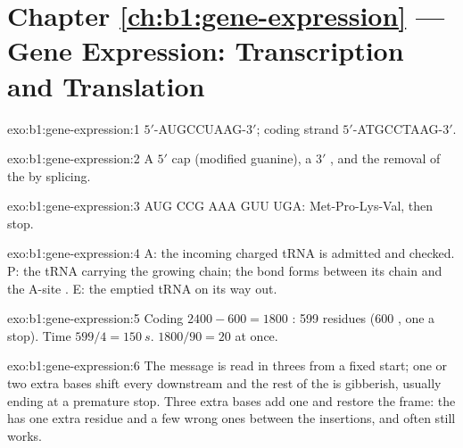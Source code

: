 \section*{Chapter \ref{ch:b1:gene-expression} --- Gene Expression: Transcription and Translation}

\begin{solution}{exo:b1:gene-expression:1}
 $5'$-AUGCCUAAG-$3'$; coding strand $5'$-ATGCCTAAG-$3'$.
\end{solution}

\begin{solution}{exo:b1:gene-expression:2}
A $5'$ cap (modified guanine), a $3'$ , and the removal of
the  by splicing.
\end{solution}

\begin{solution}{exo:b1:gene-expression:3}
AUG CCG AAA GUU UGA: Met-Pro-Lys-Val, then stop.
\end{solution}

\begin{solution}{exo:b1:gene-expression:4}
A: the incoming charged tRNA is admitted and checked. P: the tRNA
carrying the growing chain; the bond forms between its chain and the
A-site . E: the emptied tRNA on its way out.
\end{solution}

\begin{solution}{exo:b1:gene-expression:5}
Coding $2400 - 600 = 1800$ : 599 residues (600 , one
a stop). Time $599/4 = \qty{150}{s}$.  $1800/90 = 20$ at once.
\end{solution}

\begin{solution}{exo:b1:gene-expression:6}
The message is read in threes from a fixed start; one or two extra
bases shift every  downstream and the rest of the  is
gibberish, usually ending at a premature stop. Three extra bases add
one  and restore the frame: the  has one extra residue
and a few wrong ones between the insertions, and often still works.
\end{solution}

